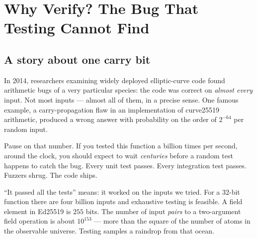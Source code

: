 \chapter{Why Verify? The Bug That Testing Cannot Find}
\label{ch:why}

\section{A story about one carry bit}

In 2014, researchers examining widely deployed elliptic-curve code found
arithmetic bugs of a very particular species: the code was correct on
\emph{almost every} input. Not most inputs --- almost all of them, in a
precise sense. One famous example, a carry-propagation flaw in an
implementation of curve25519 arithmetic, produced a wrong answer with
probability on the order of $2^{-64}$ per random input.

Pause on that number. If you tested this function a billion times per second,
around the clock, you should expect to wait \emph{centuries} before a random
test happens to catch the bug. Every unit test passes. Every integration test
passes. Fuzzers shrug. The code ships.

\begin{pitfall}
``It passed all the tests'' means: it worked on the inputs we tried. For a
32-bit function there are four billion inputs and exhaustive testing is
feasible. A field element in Ed25519 is $255$ bits. The number of input
\emph{pairs} to a two-argument field operation is about $10^{153}$ --- more
than the square of the number of atoms in the observable universe. Testing
samples a raindrop from that ocean.
\end{pitfall}

